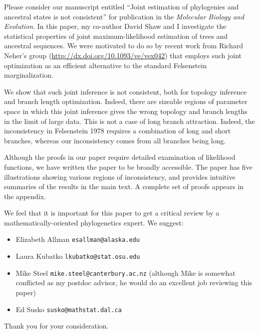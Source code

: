 \documentclass[letterpaper,10pt]{article}
\begin{document}
Please consider our manuscript entitled ``Joint estimation of phylogenies and ancestral states is not consistent'' for publication in the \textit{Molecular Biology and Evolution}.
In this paper, my co-author David Shaw and I investigate the statistical properties of joint maximum-likelihood estimation of trees and ancestral sequences.
We were motivated to do so by recent work from Richard Neher's group (\url{http://dx.doi.org/10.1093/ve/vex042}) that employs such joint optimization as an efficient alternative to the standard Felsenstein marginalization.

We show that such joint inference is not consistent, both for topology inference and branch length optimization.
Indeed, there are sizeable regions of parameter space in which this joint inference gives the wrong topology and branch lengths in the limit of large data.
This is not a case of long branch attraction.
Indeed, the inconsistency in Felsenstein 1978 requires a combination of long and short branches, whereas our inconsistency comes from all branches being long.

Although the proofs in our paper require detailed examination of likelihood functions, we have written the paper to be broadly accessible.
The paper has five illustrations showing various regions of inconsistency, and provides intuitive summaries of the results in the main text.
A complete set of proofs appears in the appendix.

We feel that it is important for this paper to get a critical review by a mathematically-oriented phylogenetics expert.
We suggest:
\begin{itemize}
\item Elizabeth Allman \texttt{esallman@alaska.edu}
\item Laura Kubatko \texttt{lkubatko@stat.osu.edu}
\item Mike Steel \texttt{mike.steel@canterbury.ac.nz} (although Mike is somewhat conflicted as my postdoc advisor, he would do an excellent job reviewing this paper)
\item Ed Susko \texttt{susko@mathstat.dal.ca}
\end{itemize}

Thank you for your consideration.
\end{document}
